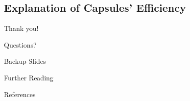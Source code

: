 \documentclass{beamer}
\begin{document}
  \subsection{Explanation of Capsules' Efficiency}

  \begin{frame}[standout]
    \begin{center}
      Thank you!

      Questions?
    \end{center}
  \end{frame}


  \appendix
  \begin{frame}[standout]
    Backup Slides
  \end{frame}

  \begin{frame}[allowframebreaks]{Further Reading}
    \tiny
  \end{frame}

  \begin{frame}[allowframebreaks]{References}
    \tiny
    \printbibliography[heading=none]
  \end{frame}
\end{document}
